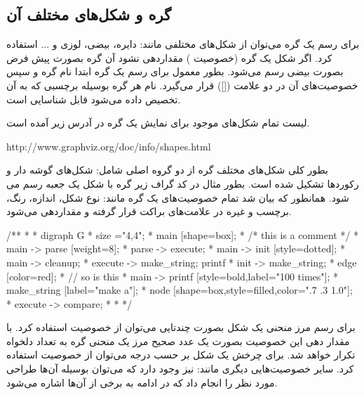 \subsection{گره‌ و شکل‌های مختلف آن}
برای رسم یک گره می‌توان از شکل‌های مختلفی مانند: دایره، بیضی، لوزی و ... استفاده کرد. اگر شکل یک گره (خصوصیت  ) مقداردهی نشود آن گره بصورت پیش فرض بصورت بیضی رسم می‌شود. بطور معمول برای رسم یک گره ابتدا نام گره و سپس خصوصیت‌های آن در دو علامت ([]) قرار می‌گیرد. نام هر گره بوسیله برچسبی که به آن تخصیص داده می‌شود قابل شناسایی است.
\begin{webreference}
لیست تمام شکل‌های موجود برای نمایش یک گره در آدرس زیر آمده است.

\begin{latin}
http://www.graphviz.org/doc/info/shapes.html
\end{latin}
\end{webreference}

بطور کلی شکل‌های مختلف گره از دو گروه اصلی شامل: شکل‌های گوشه دار و رکوردها تشکیل شده است.
بطور مثال در کد گراف زیر گره  با شکل یک جعبه رسم می شود. همانطور که بیان شد تمام خصوصیت‌های یک گره مانند: نوع شکل، اندازه، رنگ، برچسب و غیره در علامت‌های براکت قرار گرفته و مقداردهی می‌شود.
\begin{C++}
/**
* \dot
* digraph G {
* size ="4,4";
* main [shape=box];
*  /* this is a comment */
*  main -> parse [weight=8];
*  parse -> execute;
*  main -> init [style=dotted];
*  main -> cleanup;
*  execute -> { make_string; printf}
*  init -> make_string;
*  edge [color=red];
*  // so is this
*  main -> printf [style=bold,label="100 times"];
*  make_string [label="make a\nstring"];
*  node [shape=box,style=filled,color=".7 .3 1.0"];
*  execute -> compare;
* }
* \enddot
*/

\end{C++}
برای رسم مرز منحنی یک شکل بصورت چندتایی می‌توان از خصوصیت  استفاده کرد. با مقدار دهی این خصوصیت بصورت یک عدد صحیح مرز یک منحنی گره به تعداد دلخواه تکرار خواهد شد.
برای چرخش یک شکل بر حسب درجه می‌توان از خصوصیت  استفاده کرد. سایر خصوصیت‌هایی دیگری مانند:
نیز وجود دارد که می‌توان بوسیله آن‌ها طراحی مورد نظر را انجام داد که در ادامه به برخی از آن‌ها اشاره می‌شود.

